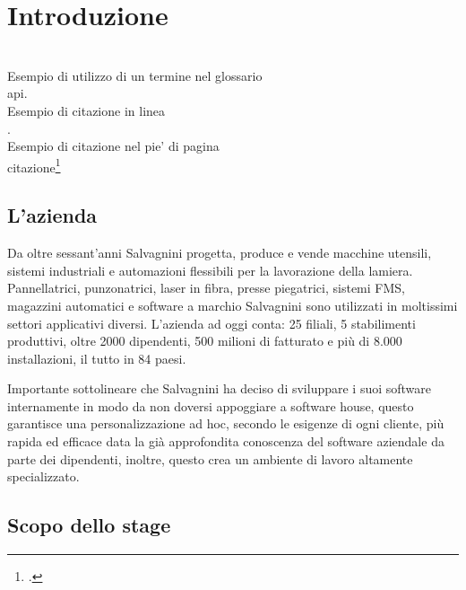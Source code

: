 \chapter{Introduzione}
\label{cap:introduzione}

 \\

\noindent Esempio di utilizzo di un termine nel glossario \\
\gls{api}. \\

\noindent Esempio di citazione in linea \\
\cite{site:agile-manifesto}. \\

\noindent Esempio di citazione nel pie' di pagina \\
citazione\footcite{womak:lean-thinking} \\

\section{L'azienda}

Da oltre sessant’anni Salvagnini progetta, produce e vende macchine utensili, sistemi industriali e automazioni flessibili per la lavorazione della lamiera. Pannellatrici, punzonatrici, laser in fibra, presse piegatrici, sistemi FMS, magazzini automatici e software a marchio Salvagnini sono utilizzati in moltissimi settori applicativi diversi.
L'azienda ad oggi conta:
25 filiali,
5 stabilimenti produttivi,
oltre 2000 dipendenti,
500 milioni di fatturato e più di 8.000 installazioni, il tutto in 84 paesi.

Importante sottolineare che Salvagnini ha deciso di sviluppare i suoi software internamente in modo da non doversi appoggiare a software house, questo garantisce una personalizzazione ad hoc, secondo le esigenze di ogni cliente, più rapida ed efficace data la già approfondita conoscenza del software aziendale da parte dei dipendenti, inoltre, questo crea un ambiente di lavoro altamente specializzato.

\section{Scopo dello stage}

